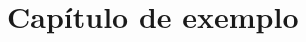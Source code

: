 \documentclass[12pt, oneside, a4paper]{ppgcc}
\begin{document}
\renewcommand\contentsname{Sumário}
\tableofcontents


\clearpage{\pagestyle{empty}\cleardoublepage}

\onehalfspace


\pagestyle{fancy}   								%
\fancyhead{}										%

\fancyhead[L,R]{\textsl{\leftmark}}
\rhead{\sffamily\thepage\space}

\cfoot{}											%
\renewcommand{\headrulewidth}{1pt}					%



\newpage
\renewcommand{\thepage}{\arabic{page}}
\setcounter{page}{1}
\renewcommand{\chaptermark}[1]{\markboth{\textit{ \chaptername \ \thechapter.\ #1}}{}}




\chapter{Capítulo de exemplo}\label{cap:exemplo}


\end{document}
